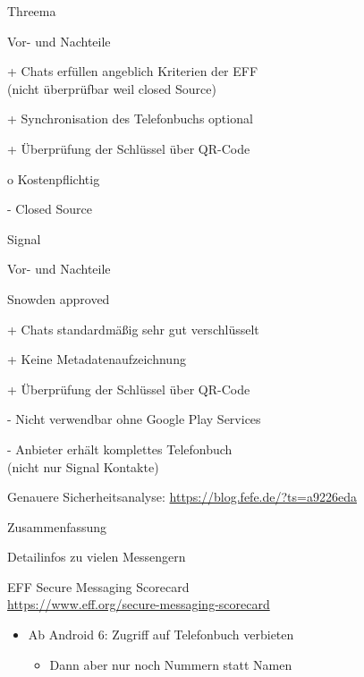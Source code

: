 \begin{frame}{Threema}
\begin{blex}{Vor- und Nachteile}
\item[+] Chats erfüllen angeblich Kriterien der EFF\\ (nicht überprüfbar weil closed Source)
\item[+] Synchronisation des Telefonbuchs optional
\item[+] Überprüfung der Schlüssel über QR-Code
\item[o] Kostenpflichtig
\item[-] Closed Source
\end{blex}
\end{frame}

\begin{frame}{Signal}
\begin{blex}{Vor- und Nachteile}
\item \glqq Snowden approved\grqq
\item[+] Chats standardmäßig sehr gut verschlüsselt
\item[+] Keine Metadatenaufzeichnung
\item[+] Überprüfung der Schlüssel über QR-Code
\item[-] Nicht verwendbar ohne Google Play Services
\item[-] Anbieter erhält komplettes Telefonbuch\\ (nicht nur Signal Kontakte)
\end{blex}
Genauere Sicherheitsanalyse: {\small\url{https://blog.fefe.de/?ts=a9226eda}}
\end{frame}

\begin{frame}{Zusammenfassung}
\begin{blit}{Detailinfos zu vielen Messengern}
\item EFF Secure Messaging Scorecard\\ {\small\url{https://www.eff.org/secure-messaging-scorecard}}
\end{blit}

\begin{itemize}
\item Ab Android 6: Zugriff auf Telefonbuch verbieten
\begin{itemize}
\item Dann aber nur noch Nummern statt Namen
\end{itemize}
\end{itemize}
\end{frame}
